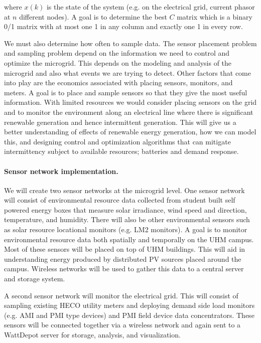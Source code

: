 \noindent where $x(k)$ is the state of the system (e.g. on the electrical grid,
current phasor at $n$ different nodes).  A goal is to determine the best
$C$ matrix which is a binary 0/1 matrix with at most one 1 in any column
and exactly one 1 in every row.

We must also determine how often to sample data.  The sensor placement
problem and sampling problem depend on the information we need to control
and optimize the microgrid.  This depends on the modeling and analysis of
the microgrid and also what events we are trying to detect.  Other factors
that come into play are the economics associated with placing sensors,
monitors, and meters.  A goal is to place and sample sensors so that they
give the most useful information.  With limited resources we would consider
placing sensors on the grid and to monitor the environment along an
electrical line where there is significant renewable generation and hence
intermittent generation.  This will give us a better understanding of
effects of renewable energy generation, how we can model this, and
designing control and optimization algorithms that can mitigate
intermittency subject to available resources; batteries and demand
response.

\paragraph{Sensor network implementation.}

We will create two sensor networks at the microgrid level.  One sensor
network will consist of environmental resource data collected from student
built self powered energy boxes that measure solar irradiance, wind speed
and direction, temperature, and humidity.  There will also be other
environmental sensors such as solar resource locational monitors (e.g. LM2
monitors).  A goal is to monitor environmental resource data both spatially
and temporally on the UHM campus.  Most of these sensors will be placed on
top of UHM buildings.  This will aid in understanding energy produced by
distributed PV sources placed around the campus.  Wireless networks will be
used to gather this data to a central server and storage system.

A second sensor network will monitor the electrical grid.  This will
consist of sampling existing HECO utility meters and deploying demand side
load monitors (e.g.  AMI and PMI type devices) and PMI field device data
concentrators.  These sensors will be connected together via a wireless
network and again sent to a WattDepot server for storage, analysis, and visualization.

